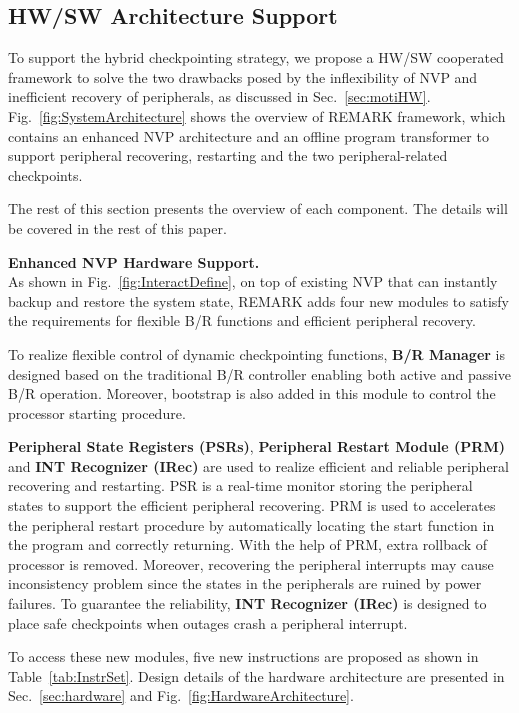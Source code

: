 \subsection{HW/SW Architecture Support}   \label{sec:sysArch}
%
To support the hybrid checkpointing strategy, we propose a HW/SW cooperated framework to solve the two drawbacks posed by the inflexibility of NVP and inefficient recovery of peripherals, as discussed in Sec.~\ref{sec:motiHW}.
Fig.~\ref{fig:SystemArchitecture} shows the overview of REMARK framework, which contains an enhanced NVP architecture and an offline program transformer to support peripheral recovering, restarting and the two peripheral-related checkpoints.

The rest of this section presents the overview of each component.
The details will be covered in the rest of this paper. 

\noindent\textbf{Enhanced NVP Hardware Support.} \\
As shown in Fig.~\ref{fig:InteractDefine}, on top of existing NVP that can instantly backup and restore the system state, REMARK adds four new modules to satisfy the requirements for flexible B/R functions and efficient peripheral recovery.

To realize flexible control of dynamic checkpointing functions, \textbf{B/R Manager} is designed based on the traditional B/R controller enabling both active and passive B/R operation.
Moreover, bootstrap is also added in this module to control the processor starting procedure.

\textbf{Peripheral State Registers (PSRs)}, \textbf{Peripheral Restart Module (PRM)} and \textbf{INT Recognizer (IRec)} are used to realize efficient and reliable peripheral recovering and restarting.
PSR is a real-time monitor storing the peripheral states to support the efficient peripheral recovering.
PRM is used to accelerates the peripheral restart procedure by automatically locating the start function in the program and correctly returning.
With the help of PRM, extra rollback of processor is removed.
Moreover, recovering the peripheral interrupts may cause inconsistency problem since the states in the peripherals are ruined by power failures.
To guarantee the reliability, \textbf{INT Recognizer (IRec)} is designed to place safe checkpoints when outages crash a peripheral interrupt.

To access these new modules, five new instructions are proposed as shown in Table~\ref{tab:InstrSet}.
Design details of the hardware architecture are presented in Sec.~\ref{sec:hardware} and Fig.~\ref{fig:HardwareArchitecture}.


